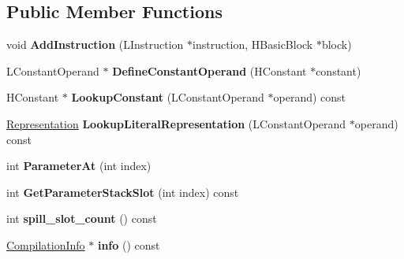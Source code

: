 \subsection*{Public Member Functions}
\begin{DoxyCompactItemize}
\item 
\hypertarget{classv8_1_1internal_1_1_l_chunk_ad61fb173e7a2305e812dfde6c6fad28f}{}void {\bfseries Add\+Instruction} (L\+Instruction $\ast$instruction, H\+Basic\+Block $\ast$block)\label{classv8_1_1internal_1_1_l_chunk_ad61fb173e7a2305e812dfde6c6fad28f}

\item 
\hypertarget{classv8_1_1internal_1_1_l_chunk_a17296845892624f9c6862be505f621bc}{}L\+Constant\+Operand $\ast$ {\bfseries Define\+Constant\+Operand} (H\+Constant $\ast$constant)\label{classv8_1_1internal_1_1_l_chunk_a17296845892624f9c6862be505f621bc}

\item 
\hypertarget{classv8_1_1internal_1_1_l_chunk_aca6d850d204e58b41bb561995e15b58f}{}H\+Constant $\ast$ {\bfseries Lookup\+Constant} (L\+Constant\+Operand $\ast$operand) const \label{classv8_1_1internal_1_1_l_chunk_aca6d850d204e58b41bb561995e15b58f}

\item 
\hypertarget{classv8_1_1internal_1_1_l_chunk_a9fae3d4fe86ca091e3ae086827dee4ed}{}\hyperlink{classv8_1_1internal_1_1_representation}{Representation} {\bfseries Lookup\+Literal\+Representation} (L\+Constant\+Operand $\ast$operand) const \label{classv8_1_1internal_1_1_l_chunk_a9fae3d4fe86ca091e3ae086827dee4ed}

\item 
\hypertarget{classv8_1_1internal_1_1_l_chunk_a8086a0448009f33580ff1038d86eeb38}{}int {\bfseries Parameter\+At} (int index)\label{classv8_1_1internal_1_1_l_chunk_a8086a0448009f33580ff1038d86eeb38}

\item 
\hypertarget{classv8_1_1internal_1_1_l_chunk_a162cec8165c964ff82c6b107cb898a1c}{}int {\bfseries Get\+Parameter\+Stack\+Slot} (int index) const \label{classv8_1_1internal_1_1_l_chunk_a162cec8165c964ff82c6b107cb898a1c}

\item 
\hypertarget{classv8_1_1internal_1_1_l_chunk_a38a11ed28abedc4831ec98147cd615d6}{}int {\bfseries spill\+\_\+slot\+\_\+count} () const \label{classv8_1_1internal_1_1_l_chunk_a38a11ed28abedc4831ec98147cd615d6}

\item 
\hypertarget{classv8_1_1internal_1_1_l_chunk_ad308e7305ebb06e07c7f2c87ad68e533}{}\hyperlink{classv8_1_1internal_1_1_compilation_info}{Compilation\+Info} $\ast$ {\bfseries info} () const \label{classv8_1_1internal_1_1_l_chunk_ad308e7305ebb06e07c7f2c87ad68e533}


\end{DoxyCompactItemize}
